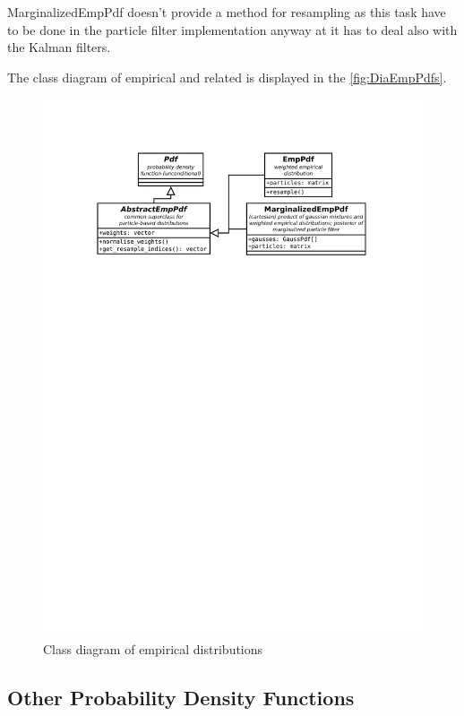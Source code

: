 MarginalizedEmpPdf doesn't provide a method for resampling as this task have to be done in the
particle filter implementation anyway at it has to deal also with the Kalman filters.

The class diagram of empirical {\pdfs} and related is displayed in the \autoref{fig:DiaEmpPdfs}.

\begin{figure}[h]
	\centering
	\includegraphics[width=\textwidth,keepaspectratio=true,clip=true,trim=3cm 210mm 3cm 3cm]{./diagrams/emp_pdfs.pdf}
	\vspace{-8mm}
	\caption{Class diagram of empirical distributions}
	\label{fig:DiaEmpPdfs}
\end{figure}

\subsection{Other Probability Density Functions}

